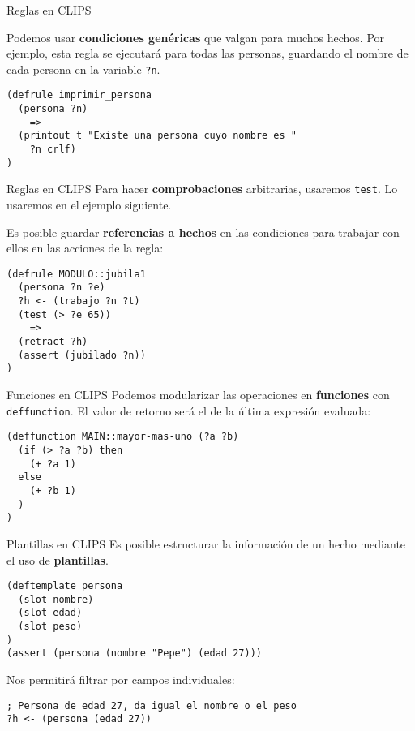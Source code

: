 \documentclass[smaller,spanish,xcolor=svgnames]{beamer}
\begin{document}
\begin{frame}[fragile]{Reglas en CLIPS}

Podemos usar \textbf{condiciones genéricas} que valgan para muchos
hechos. Por ejemplo, esta regla se ejecutará para todas las personas, guardando
el nombre de cada persona en la variable \texttt{?n}.

\begin{verbatim}
(defrule imprimir_persona
  (persona ?n)
    =>
  (printout t "Existe una persona cuyo nombre es " 
    ?n crlf)
)
\end{verbatim}
\end{frame}

\begin{frame}[fragile]{Reglas en CLIPS}
  Para hacer \textbf{comprobaciones} arbitrarias, usaremos \texttt{test}. Lo usaremos en
  el ejemplo siguiente.

  \medskip

  Es posible guardar \textbf{referencias a hechos} en las condiciones para trabajar con
  ellos en las acciones de la regla:

\begin{verbatim}
(defrule MODULO::jubila1
  (persona ?n ?e)
  ?h <- (trabajo ?n ?t)
  (test (> ?e 65))
    =>
  (retract ?h)
  (assert (jubilado ?n))
)
\end{verbatim}  
\end{frame}

\begin{frame}[fragile]{Funciones en CLIPS}
  Podemos modularizar las operaciones en \textbf{funciones} con \texttt{deffunction}. El
  valor de retorno será el de la última expresión evaluada:

\begin{verbatim}
(deffunction MAIN::mayor-mas-uno (?a ?b)
  (if (> ?a ?b) then
    (+ ?a 1)
  else
    (+ ?b 1)
  )
)
\end{verbatim}
\end{frame}

\begin{frame}[fragile]{Plantillas en CLIPS}
  Es posible estructurar la información de un hecho mediante el uso de
  \textbf{plantillas}.

\begin{verbatim}
(deftemplate persona
  (slot nombre)
  (slot edad)
  (slot peso)
)
(assert (persona (nombre "Pepe") (edad 27)))
\end{verbatim}

Nos permitirá filtrar por campos individuales:

\begin{verbatim}
; Persona de edad 27, da igual el nombre o el peso
?h <- (persona (edad 27))
\end{verbatim}
  
\end{frame}
\end{document}
